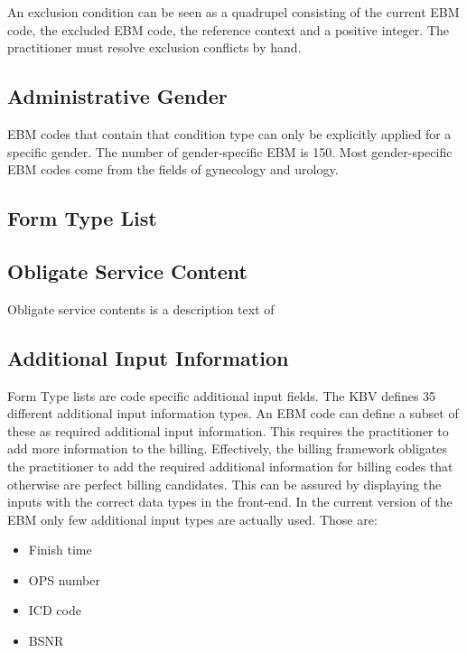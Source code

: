 An exclusion condition can be seen as a quadrupel consisting of the current EBM code, the excluded EBM code, the reference context and a positive integer.
The practitioner must resolve exclusion conflicts by hand.

\subsection{Administrative Gender}\label{subsec:administrative-gender}
EBM codes that contain that condition type can only be explicitly applied for a specific gender.
The number of gender-specific EBM is 150.
Most gender-specific EBM codes come from the fields of gynecology and urology.

\subsection{Form Type List}\label{subsec:form-type-list}

\subsection{Obligate Service Content}\label{subsec:obligate-service-content}
Obligate service contents is a description text of \todo{}

\subsection{Additional Input Information}\label{subsec:additional-information}
Form Type lists are code specific additional input fields.
The KBV defines 35 different additional input information types.
An EBM code can define a subset of these as required additional input information.
This requires the practitioner to add more information to the billing.
Effectively, the billing framework obligates the practitioner to add the required additional information for billing codes that otherwise are perfect billing candidates.
This can be assured by displaying the inputs with the correct data types in the front-end.
In the current version of the EBM only few additional input types are actually used.
Those are:
\begin{itemize}
    \item Finish time
    \item OPS number
    \item ICD code
    \item BSNR
\end{itemize}
